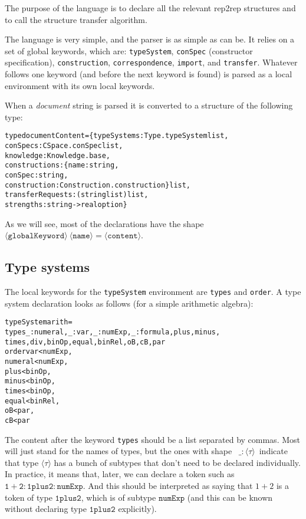 \documentclass[a4paper]{article}
\theoremstyle{definition}
\begin{document}
	The purpose of the language is to declare all the relevant rep2rep structures and to call the structure transfer algorithm.
	
	The language is very simple, and the parser is as simple as can be. It relies on a set of global keywords, which are: \texttt{typeSystem}, \texttt{conSpec} (constructor specification), \texttt{construction}, \texttt{correspondence}, \texttt{import}, and \texttt{transfer}. Whatever follows one keyword (and before the next keyword is found) is parsed as a local environment with its own local keywords.
	
	When a \textit{document} string is parsed it is converted to a structure of the following type: 
\begin{alltt}
type documentContent = \{typeSystems : Type.typeSystem list,
                        conSpecs : CSpace.conSpec list,
                        knowledge : Knowledge.base,
                        constructions : \{name : string, 
                                         conSpec : string, 
                                         construction : Construction.construction\} list,
                        transferRequests : (string list) list,
                        strengths : string -> real option\}
\end{alltt}

	As we will see, most of the declarations have the shape  $\mathtt{\langle globalKeyword\rangle\ \langle name\rangle = \langle content\rangle}$.
	
	\subsection{Type systems}
	The local keywords for the \texttt{typeSystem} environment are \texttt{types} and \texttt{order}. A type system declaration looks as follows (for a simple arithmetic algebra):
\begin{alltt}
typeSystem arith =
    types _:numeral, _:var, _:numExp, _:formula, plus, minus, 
          times, div, binOp, equal, binRel, oB, cB, par
    order var < numExp,
          numeral < numExp,
          plus < binOp,
          minus < binOp,
          times < binOp,
          equal < binRel,
          oB < par,
          cB < par
\end{alltt}
	The content after the keyword \texttt{types} should be a list separated by commas. Most will just stand for the names of types, but the ones with shape \ $\mathtt{\_:\langle \tau\rangle}$\ indicate that type $\mathtt{\langle \tau\rangle}$ has a bunch of subtypes that don't need to be declared individually. In practice, it means that, later, we can declare a token such as $\mathtt{1+2:1plus2:numExp}$. And this should be interpreted as saying that $1+2$ is a token of type $\mathtt{1plus2}$, which is of subtype $\mathtt{numExp}$ (and this can be known without declaring type $\mathtt{1plus2}$ explicitly).
	
\end{document}
